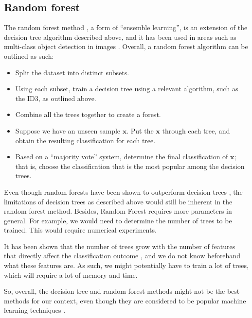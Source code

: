 \documentclass[12pt, twoside, a4paper]{report}
\begin{document}
\subsection{Random forest}
The random forest method \cite{RefWorks:101}, a form of ``ensemble learning'', is an extension of the decision tree algorithm described above, and it has been used in areas such as multi-class object detection in images \cite{RefWorks:100}. Overall, a random forest algorithm can be outlined as such:
\begin{itemize}
\item Split the dataset into distinct subsets.
\item Using each subset, train a decision tree using a relevant algorithm, such as the ID3, as outlined above.
\item Combine all the trees together to create a forest.
\item Suppose we have an unseen sample $\boldsymbol x$.  Put the $\boldsymbol x$ through each tree, and obtain the resulting classification for each tree.
\item Based on a ``majority vote'' system, determine the final classification of $\boldsymbol x$; that is, choose the classification that is the most popular among the decision trees.
\end{itemize}

Even though random forests have been shown to outperform decision trees \cite{RefWorks:103}, the limitations of decision trees as described above would still be inherent in the random forest method. Besides, Random Forest requires more parameters in general. For example, we would need to determine the number of trees to be trained. This would require numerical experiments.

It has been shown that the number of trees grow with the number of features that directly affect the classification outcome \cite{RefWorks:102}, and we do not know beforehand what these features are. As such, we might potentially have to train a lot of trees, which will require a lot of memory and time.

So, overall, the decision tree and random forest methods might not be the best methods for our context, even though they are considered to be popular machine learning techniques \cite{RefWorks:103}.
\end{document}
